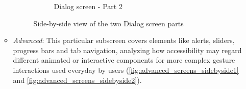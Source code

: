 \begin{enumerate}
\begin{itemize}
\begin{figure}[ht]
\begin{subfigure}[b]{0.48\textwidth}
                \caption{Dialog screen - Part 2}
                \label{fig:dialog-right}
            \end{subfigure}
            \caption{Side-by-side view of the two Dialog screen parts}
            \label{fig:dialog_screens_sidebyside}
        \end{figure}

       \item \textit{Advanced}: This particular subscreen covers elements like alerts, sliders, progress bars and tab navigation, analyzing how accessibility may regard different animated or interactive components for more complex gesture interactions used everyday by users (\ref{fig:advanced_screens_sidebyside1} and \ref{fig:advanced_screens_sidebyside2}).

       \begin{figure}[ht]
            \centering
            \begin{subfigure}[b]{0.48\textwidth}
                \centering

\end{subfigure}
\end{figure}
\end{itemize}
\end{enumerate}
